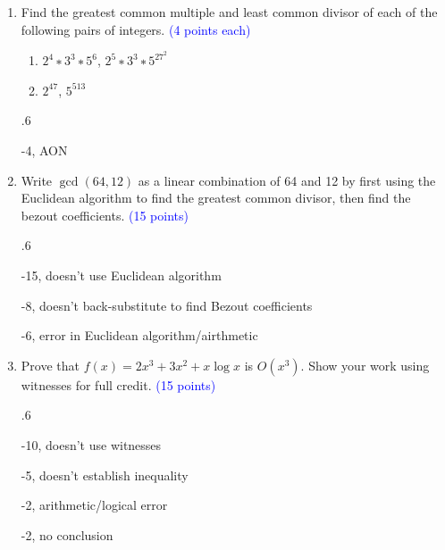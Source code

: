 \documentclass{article}
\newcommand{\pt}[1]{\textcolor{blue}{(#1 points)}}
\newcommand{\pte}[1]{\textcolor{blue}{(#1 points each)}}
\newenvironment{rubric}
{
\par
\begin{spacing}{.6}
\begin{itshape}
\color{red}

}
{
\end{itshape}
\end{spacing}
\par
}
\begin{document}
\begin{enumerate}
\begin{rubric}
    -4, AON
\end{rubric}

\item Find the greatest common multiple and least common divisor of each of the following pairs of integers. \pte{4}
\begin{enumerate}
    \item $2^4 ∗3^3 ∗5^6$, $2^5 ∗3^3 ∗5^27^2$
    \item $2^47$, $5^513$
\end{enumerate}

\begin{rubric}
    -4, AON
\end{rubric}

\item Write $\gcd(64,12)$ as a linear combination of 64 and 12 by first using the Euclidean algorithm to find the greatest common divisor, then find the bezout coefficients. \pt{15}


\begin{rubric}
    -15, doesn't use Euclidean algorithm
    
    -8, doesn't back-substitute to find Bezout coefficients
    
    -6, error in Euclidean algorithm/airthmetic
    
    
\end{rubric}

\item Prove that $f(x) = 2x^3 + 3x^2 + x\log{x}$ is $O(x^3)$. Show your work using witnesses for full credit. \pt{15}
\begin{rubric}
-10, doesn't use witnesses

-5, doesn't establish inequality

-2, arithmetic/logical error

-2, no conclusion
\end{rubric}

\end{enumerate}
\end{document}

